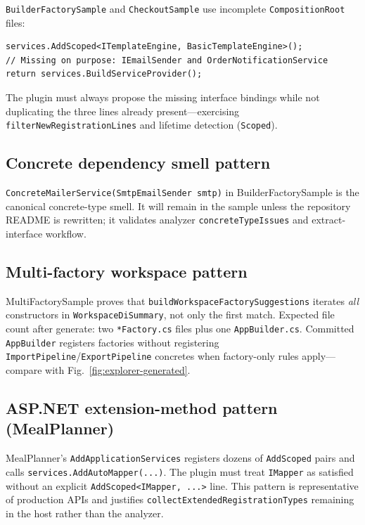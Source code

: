 \texttt{BuilderFactorySample} and \texttt{CheckoutSample} use incomplete \texttt{CompositionRoot} files:

\begin{lstlisting}[caption={Intentional gap in BuilderFactorySample (stable test input)}]
services.AddScoped<ITemplateEngine, BasicTemplateEngine>();
// Missing on purpose: IEmailSender and OrderNotificationService
return services.BuildServiceProvider();
\end{lstlisting}

The plugin must always propose the missing interface bindings while not duplicating the three lines already present---exercising \texttt{filterNewRegistrationLines} and lifetime detection (\texttt{Scoped}).

\subsection{Concrete dependency smell pattern}

\texttt{ConcreteMailerService(SmtpEmailSender smtp)} in BuilderFactorySample is the canonical concrete-type smell. It will remain in the sample unless the repository README is rewritten; it validates analyzer \texttt{concreteTypeIssues} and extract-interface workflow.

\subsection{Multi-factory workspace pattern}

MultiFactorySample proves that \texttt{buildWorkspaceFactorySuggestions} iterates \emph{all} constructors in \texttt{WorkspaceDiSummary}, not only the first match. Expected file count after generate: two \texttt{*Factory.cs} files plus one \texttt{AppBuilder.cs}. Committed \texttt{AppBuilder} registers factories without registering \texttt{ImportPipeline}/\texttt{ExportPipeline} concretes when factory-only rules apply---compare with Fig.~\ref{fig:explorer-generated}.

\subsection{ASP.NET extension-method pattern (MealPlanner)}

MealPlanner's \texttt{AddApplicationServices} registers dozens of \texttt{AddScoped} pairs and calls \texttt{services.AddAutoMapper(...)}. The plugin must treat \texttt{IMapper} as satisfied without an explicit \texttt{AddScoped<IMapper, ...>} line. This pattern is representative of production APIs and justifies \texttt{collectExtendedRegistrationTypes} remaining in the host rather than the analyzer.

